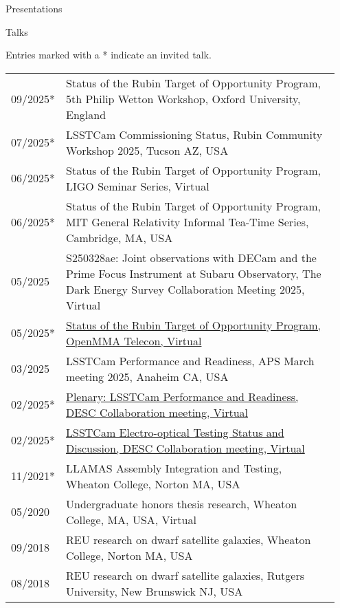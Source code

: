 \documentclass{resume} %
\begin{document}
\begin{rSection}{Presentations}

\begin{rSubsection}{Talks}{}{}{}

Entries marked with a * indicate an invited talk.

    \begin{table}[h]
\begin{tabular}{p{0.07\linewidth} p{0.88\linewidth}}
09/2025* & Status of the Rubin Target of Opportunity Program, 5th Philip Wetton Workshop, Oxford University, England\\
07/2025* & LSSTCam Commissioning Status, Rubin Community Workshop 2025, Tucson AZ, USA\\
06/2025* & Status of the Rubin Target of Opportunity Program, LIGO Seminar Series, Virtual\\
06/2025* & Status of the Rubin Target of Opportunity Program, MIT General Relativity Informal Tea-Time Series, Cambridge, MA, USA\\
05/2025 & S250328ae: Joint observations with DECam and the Prime Focus Instrument at Subaru Observatory, The Dark Energy Survey Collaboration Meeting 2025, Virtual\\
05/2025* & \href{https://github.com/scimma/openMMA/wiki/Telecon20250522}{Status of the Rubin Target of Opportunity Program, OpenMMA Telecon, Virtual}\\
03/2025 & LSSTCam Performance and Readiness, APS March meeting 2025, Anaheim CA, USA\\
02/2025* & \href{https://docs.google.com/presentation/d/18RmTzV5id9RSE4_1xui-RJvK5FeGknrt8Ro1nBn32nk/edit?usp=sharing}{Plenary: LSSTCam Performance and Readiness, DESC Collaboration meeting, Virtual}\\
02/2025* & \href{https://docs.google.com/presentation/d/12EPsuWSixo40_oqrDPNaXstYnqDzhI_2aFL2hd7IwTE/edit#slide=id.g2ade3bc380_0_0}{LSSTCam Electro-optical Testing Status and Discussion, DESC Collaboration meeting, Virtual}\\
11/2021* & LLAMAS Assembly Integration and Testing, Wheaton College, Norton MA, USA\\
05/2020 & Undergraduate honors thesis research, Wheaton College, MA, USA, Virtual\\ 
09/2018 & REU research on dwarf satellite galaxies, Wheaton College, Norton MA, USA\\
08/2018 & REU research on dwarf satellite galaxies, Rutgers University, New Brunswick NJ, USA\\
\end{tabular}
\end{table}
\end{rSubsection}


\end{rSection}
\end{document}
